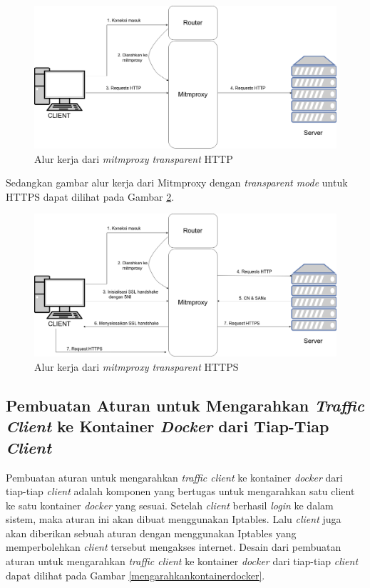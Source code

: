 \begin{figure}[H]
	\centering
	\includegraphics[width=\linewidth]{images/bab3/mitmproxyhttp}
	\caption{Alur kerja dari \textit{mitmproxy transparent} HTTP}
	\label{mitmproxyhttp}
\end{figure}

Sedangkan gambar alur kerja dari Mitmproxy dengan \textit{transparent mode} untuk HTTPS dapat dilihat pada Gambar \ref{mitmproxyhttps}.

\begin{figure}[H]
	\centering
	\includegraphics[width=\linewidth]{images/bab3/mitmproxyhttps}
	\caption{Alur kerja dari \textit{mitmproxy transparent} HTTPS}
	\label{mitmproxyhttps}
\end{figure}

\subsection{Pembuatan Aturan untuk Mengarahkan \textit{Traffic Client} ke Kontainer \textit{Docker} dari Tiap-Tiap \textit{Client}}
Pembuatan aturan untuk mengarahkan \textit{traffic client} ke kontainer \textit{docker} dari tiap-tiap \textit{client} adalah komponen yang bertugas untuk mengarahkan satu client ke satu kontainer \textit{docker} yang sesuai. Setelah \textit{client} berhasil \textit{login} ke dalam sistem, maka aturan ini akan dibuat menggunakan Iptables. Lalu \textit{client} juga akan diberikan sebuah aturan dengan menggunakan Iptables yang memperbolehkan \textit{client} tersebut mengakses internet. Desain dari pembuatan aturan untuk mengarahkan \textit{traffic client} ke kontainer \textit{docker} dari tiap-tiap \textit{client} dapat dilihat pada Gambar \ref{mengarahkankontainerdocker}.

